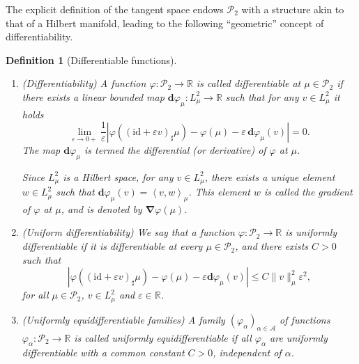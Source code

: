 \documentclass[sn-mathphys-num]{sn-jnl}
\numberwithin{equation}{section}
\theoremstyle{mythm}
\theoremstyle{mydef}
\newtheorem{definition}[proposition]{Definition}
\renewcommand{\phi}{\varphi}
\newcommand{\id}{\mathrm{id}}
\renewcommand{\mathbf}[1]{\bm{#1}}
\begin{document}
The explicit definition of the tangent space endows  $\mathcal P_2$ with a structure akin to that of a Hilbert manifold, leading to the following ``geometric'' concept of differentiability.


\begin{definition}[Differentiable functions]\label{def:diff_fn}
~%
  \begin{enumerate}
    \item (\emph{Differentiability}) A function \( \phi\colon \mathcal{P}_2\to \mathbb{R} \) is called \emph{differentiable} at \( \mu\in \mathcal{P}_2 \) if there exists a linear bounded map \( \mathbf{d}\phi_{\mu} \colon {L}^2_{\mu}\to \mathbb{R}\) such that for any \( v\in L^2_{\mu} \) it holds
\[
  \lim_{\varepsilon\to 0+}\frac{1}{\varepsilon}\left|\phi\left((\id+\varepsilon v)_\sharp \mu\right)- \phi(\mu)- \varepsilon\, \mathbf{d}\phi_{\mu}(v) \right| = 0.
\]
The map \( \mathbf{d}\phi_{\mu} \) is termed the \emph{differential} (or \emph{derivative}) of \( \phi \) at \( \mu \).

Since \( {L}^2_{\mu} \) is a Hilbert space, for any \( v\in {L}^2_{\mu} \), there exists a unique element \( w\in {L}^2_{\mu} \) such that \( \mathbf{d}\phi_{\mu}(v) = \left< v,w \right>_{\mu} \).
This element \( w \) is called the \emph{gradient} of \( \phi \) at \( \mu \), and is denoted by \( \bm \nabla \phi(\mu) \).

 \item (\emph{Uniform differentiability}) We say that a function \( \phi\colon \mathcal{P}_2\to \mathbb{R} \) is \emph{uniformly differentiable} if it is differentiable at every \( \mu\in \mathcal{P}_2 \), and there exists \( C>0 \) such that
  \[
    \left|\phi\left((\id +\varepsilon v)_{\sharp}\mu\right) - \phi(\mu) - \varepsilon\mathbf{d}\phi_{\mu} (v)\right|\le C\|v\|^{2}_{\mu} \varepsilon^2,
  \]
  for all \( \mu\in \mathcal{P}_2 \), \( v\in {L}^2_{\mu} \) and \( \varepsilon\in \mathbb{R} \). 

  \item (\emph{Uniformly equidifferentiable families}) A family $(\phi_\alpha)_{\alpha\in \mathcal A}$ of functions \( \phi_\alpha\colon \mathcal{P}_2\to \mathbb{R} \) is called uniformly equidifferentiable if all $\phi_\alpha$ are uniformly differentiable with a common constant $C>0$, independent of $\alpha$. 
  \end{enumerate}
\end{definition}
\end{document}
